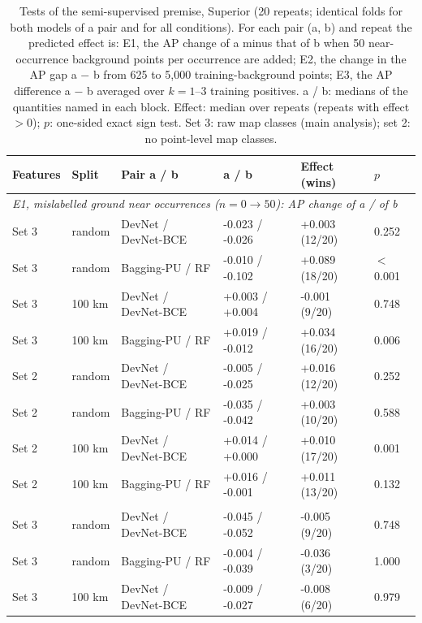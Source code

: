 \documentclass[pdflatex,sn-apa]{sn-jnl}
\begin{document}
\begin{table}[t]
\caption{Tests of the semi-supervised premise, Superior (20 repeats; identical folds for both models of a pair and for all conditions). For each pair (a, b) and repeat the predicted effect is: E1, the AP change of a minus that of b when 50 near-occurrence background points per occurrence are added; E2, the change in the AP gap a $-$ b from 625 to 5,000 training-background points; E3, the AP difference a $-$ b averaged over $k = 1$--3 training positives. a / b: medians of the quantities named in each block. Effect: median over repeats (repeats with effect $> 0$); $p$: one-sided exact sign test. Set 3: raw map classes (main analysis); set 2: no point-level map classes.}\label{tab:semisup}
\scriptsize
\setlength{\tabcolsep}{2.5pt}
\begin{tabular*}{\textwidth}{@{\extracolsep\fill}llllll}
\toprule
Features & Split & Pair a / b & a / b & Effect (wins) & $p$ \\
\midrule
\multicolumn{6}{l}{\textit{E1, mislabelled ground near occurrences ($n = 0 \rightarrow 50$): AP change of a / of b}} \\
Set 3 & random & DevNet / DevNet-BCE & -0.023 / -0.026 & +0.003 (12/20) & 0.252 \\
Set 3 & random & Bagging-PU / RF & -0.010 / -0.102 & +0.089 (18/20) & $<$0.001 \\
Set 3 & 100 km & DevNet / DevNet-BCE & +0.003 / +0.004 & -0.001 (9/20) & 0.748 \\
Set 3 & 100 km & Bagging-PU / RF & +0.019 / -0.012 & +0.034 (16/20) & 0.006 \\
Set 2 & random & DevNet / DevNet-BCE & -0.005 / -0.025 & +0.016 (12/20) & 0.252 \\
Set 2 & random & Bagging-PU / RF & -0.035 / -0.042 & +0.003 (10/20) & 0.588 \\
Set 2 & 100 km & DevNet / DevNet-BCE & +0.014 / +0.000 & +0.010 (17/20) & 0.001 \\
Set 2 & 100 km & Bagging-PU / RF & +0.016 / -0.001 & +0.011 (13/20) & 0.132 \\
\addlinespace
\multicolumn{6}{l}{\textit{E2, unlabelled pool ($625 \rightarrow 5{,}000$): AP gap a $-$ b with 625 / with 5,000 points}} \\
Set 3 & random & DevNet / DevNet-BCE & -0.045 / -0.052 & -0.005 (9/20) & 0.748 \\
Set 3 & random & Bagging-PU / RF & -0.004 / -0.039 & -0.036 (3/20) & 1.000 \\
Set 3 & 100 km & DevNet / DevNet-BCE & -0.009 / -0.027 & -0.008 (6/20) & 0.979 \\

\end{tabular*}
\end{table}
\end{document}
